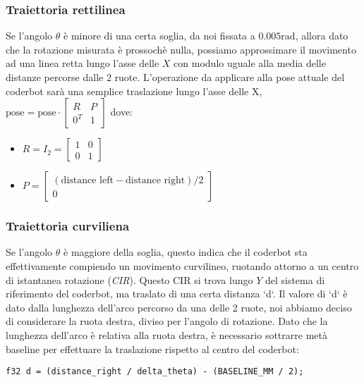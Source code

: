 \documentclass[11pt]{article}
\begin{document}
\subsubsection{Traiettoria rettilinea}
\label{sec:orgddcda78}
Se l'angolo \(\theta\) è minore di una certa soglia, da noi fissata a \(0.005\text{rad}\), allora dato che la rotazione misurata è prossochè nulla, possiamo approssimare il movimento ad una linea retta lungo l'asse delle \(X\) con modulo uguale alla media delle distanze percorse dalle 2 ruote.
L'operazione da applicare alla pose attuale del coderbot sarà una semplice traslazione lungo l'asse delle X, \(\text{pose}=\text{pose}\cdot\begin{bmatrix}R&P\\0^T&1\end{bmatrix}\) dove:
\begin{itemize}
\item \(R=I_2=\begin{bmatrix}1&0\\0&1\end{bmatrix}\)
\item \(P= \begin{bmatrix}(\text{distance left} - \text{distance right})/2\\0\end{bmatrix}\)
\end{itemize}
\subsubsection{Traiettoria curviliena}
\label{sec:orgc2bf1e1}
Se l'angolo \(\theta\) è maggiore della soglia, questo indica che il coderbot sta effettivamente compiendo un movimento curvilineo, ruotando attorno a un centro di istantanea rotazione (\emph{CIR}). Questo CIR si trova lungo \(Y\) del sistema di riferimento del coderbot, ma traslato di una certa distanza `d`.
Il valore di `d` è dato dalla lunghezza dell'arco percorso da una delle 2 ruote, noi abbiamo deciso di considerare la ruota destra, diviso per l'angolo di rotazione. Dato che la lunghezza dell'arco è relativa alla ruota destra, è necessario sottrarre metà baseline per effettuare la traslazione rispetto al centro del coderbot:
\begin{verbatim}
f32 d = (distance_right / delta_theta) - (BASELINE_MM / 2);
\end{verbatim}
\end{document}
